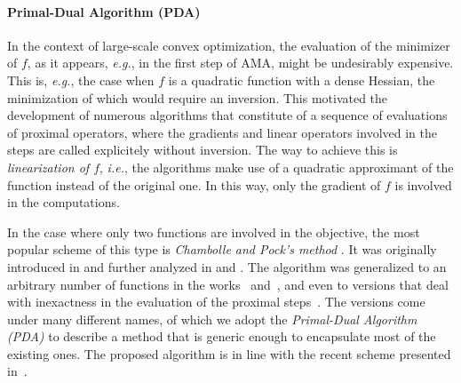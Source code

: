 \documentclass[openany]{now}
\newcommand{\eg}{{\it e.g.}}
\newcommand{\ie}{{\it i.e.}}
\begin{document}
  \paragraph{Primal-Dual Algorithm (PDA)} In the context of large-scale convex optimization, the evaluation of the minimizer of $f$, as it appears, \eg, in the first step of AMA, might be undesirably expensive. This is, \eg, the case when $f$ is a quadratic function with a dense Hessian, the minimization of which would require an inversion. This motivated the development of numerous algorithms that constitute of a sequence of evaluations of proximal operators, where the gradients and linear operators involved in the steps are called explicitely without inversion. The way to achieve this is \emph{linearization of $f$}, \ie, the algorithms make use of a quadratic approximant of the function instead of the original one. In this way, only the gradient of $f$ is involved in the computations. 

  In the case where only two functions are involved in the objective, the most popular scheme of this type is \emph{Chambolle and Pock's method} \cite{chamb}. It was originally introduced in \cite{zhu2008efficient} and further analyzed in \cite{chamb} and \cite{HeY12:pdhg}. The algorithm was generalized to an arbitrary number of functions in the works~\cite{combettes2012primal} and~\cite{condat2011primal}, and even to versions that deal with inexactness in the evaluation of the proximal steps~\cite{pda_vu}. The versions come under many different names, of which we adopt the \emph{Primal-Dual Algorithm (PDA)} to describe a method that is generic enough to encapsulate most of the existing ones. The proposed algorithm is in line with the recent scheme presented in~\cite{combettes2014forward}.
\end{document}
